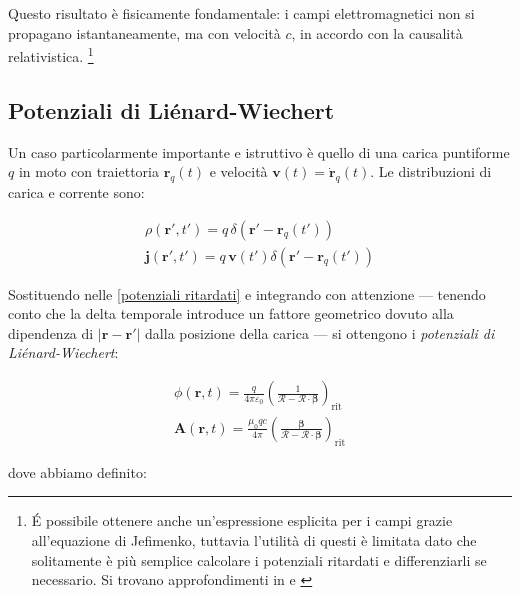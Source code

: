 Questo risultato è fisicamente fondamentale: i campi elettromagnetici non si propagano istantaneamente, ma con velocità $c$, in accordo con la causalità relativistica. \footnote{\'E possibile ottenere anche un'espressione esplicita per i campi grazie all'equazione di Jefimenko, tuttavia l'utilità di questi è limitata dato che solitamente è più semplice calcolare i potenziali ritardati e differenziarli se necessario. 
Si trovano approfondimenti in \cite{ElettrodinamicaClassica} e \cite{IntroductiontoElectrodynamics}}

\subsection{Potenziali di Liénard-Wiechert}

Un caso particolarmente importante e istruttivo è quello di una carica puntiforme $q$ in moto con traiettoria $\mathbf{r}_q(t)$ e velocità  $\mathbf{v}(t) = \dot{\mathbf{r}}_q(t)$. Le distribuzioni di carica e corrente sono:

\begin{align}
    \rho(\mathbf{r'}, t') = q \, \delta(\mathbf{r'} - \mathbf{r}_q(t')) \\
    \mathbf{j}(\mathbf{r'}, t') = q \, \mathbf{v}(t') \delta(\mathbf{r'} - \mathbf{r}_q(t'))
\end{align}

Sostituendo nelle \ref{potenziali ritardati} e integrando con attenzione — tenendo conto che la delta temporale introduce un fattore geometrico dovuto alla dipendenza di $|\mathbf{r} - \mathbf{r'}|$ dalla posizione della carica — si ottengono i \emph{potenziali di Liénard-Wiechert}: 

\begin{tcolorbox}[colback=yellow!10!white, colframe=orange!70!black, boxrule=0.8pt]
\begin{align} \label{eq: potenziali_Liènard-Wiechert}
    \phi(\mathbf{r}, t) = \frac{q}{4\pi\varepsilon_0} \left( \frac{1}{\mathcal{R} - \boldsymbol{\mathcal{R}} \cdot \boldsymbol{\beta}} \right)_{\text{rit}} \\
    \mathbf{A}(\mathbf{r}, t) = \frac{\mu_0 q c}{4\pi} \left( \frac{\boldsymbol{\beta}}{\mathcal{R} - \boldsymbol{\mathcal{R}} \cdot \boldsymbol{\beta}} \right)_{\text{rit}}
\end{align}
\end{tcolorbox}

dove abbiamo definito:

